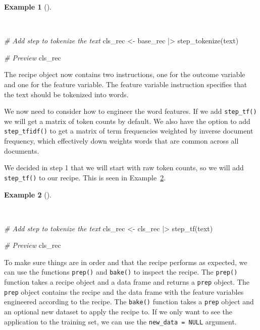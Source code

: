 \documentclass[
  letterpaper,
  DIV=11,
  numbers=noendperiod]{scrreprt}
\newenvironment{Shaded}{\begin{snugshade}}{\end{snugshade}}
\newcommand{\CommentTok}[1]{\textcolor[rgb]{0.00,0.00,0.00}{\textit{#1}}}
\newcommand{\FunctionTok}[1]{\textcolor[rgb]{0.00,0.00,0.00}{#1}}
\newcommand{\NormalTok}[1]{\textcolor[rgb]{0.00,0.00,0.00}{#1}}
\newcommand{\OtherTok}[1]{\textcolor[rgb]{0.00,0.00,0.00}{#1}}
\newcommand{\SpecialCharTok}[1]{\textcolor[rgb]{0.00,0.00,0.00}{#1}}
\theoremstyle{definition}
\newtheorem{example}{Example}[chapter]
\theoremstyle{remark}
\begin{document}
\begin{example}[]\protect\hypertarget{exm-pda-class-recipe-tokenize}{}\label{exm-pda-class-recipe-tokenize}

~

\begin{Shaded}
\begin{Highlighting}[]
\CommentTok{\# Add step to tokenize the text}
\NormalTok{cls\_rec }\OtherTok{\textless{}{-}}
\NormalTok{  base\_rec }\SpecialCharTok{|\textgreater{}}
  \FunctionTok{step\_tokenize}\NormalTok{(text)}

\CommentTok{\# Preview}
\NormalTok{cls\_rec}
\end{Highlighting}
\end{Shaded}

\end{example}

The recipe object now contains two instructions, one for the outcome
variable and one for the feature variable. The feature variable
instruction specifies that the text should be tokenized into words.

We now need to consider how to engineer the word features. If we add
\texttt{step\_tf()} we will get a matrix of token counts by default. We
also have the option to add \texttt{step\_tfidf()} to get a matrix of
term frequencies weighted by inverse document frequency, which
effectively down weights words that are common across all documents.

We decided in step 1 that we will start with raw token counts, so we
will add \texttt{step\_tf()} to our recipe. This is seen in
Example~\ref{exm-pda-class-recipe-tf}.

\begin{example}[]\protect\hypertarget{exm-pda-class-recipe-tf}{}\label{exm-pda-class-recipe-tf}

~

\begin{Shaded}
\begin{Highlighting}[]
\CommentTok{\# Add step to tokenize the text}
\NormalTok{cls\_rec }\OtherTok{\textless{}{-}}
\NormalTok{  cls\_rec }\SpecialCharTok{|\textgreater{}}
  \FunctionTok{step\_tf}\NormalTok{(text)}

\CommentTok{\# Preview}
\NormalTok{cls\_rec}
\end{Highlighting}
\end{Shaded}

\end{example}

To make sure things are in order and that the recipe performs as
expected, we can use the functions \texttt{prep()} and \texttt{bake()}
to inspect the recipe. The \texttt{prep()} function takes a recipe
object and a data frame and returns a \texttt{prep} object. The
\texttt{prep} object contains the recipe and the data frame with the
feature variables engineered according to the recipe. The
\texttt{bake()} function takes a \texttt{prep} object and an optional
new dataset to apply the recipe to. If we only want to see the
application to the training set, we can use the
\texttt{new\_data\ =\ NULL} argument.
\end{document}
